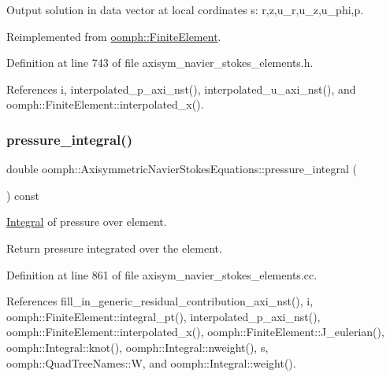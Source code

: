 Output solution in data vector at local cordinates s\+: r,z,u\+\_\+r,u\+\_\+z,u\+\_\+phi,p. 



Reimplemented from \hyperlink{classoomph_1_1FiniteElement_a8bf3f75b55d4e67b644df3e22c192596}{oomph\+::\+Finite\+Element}.



Definition at line 743 of file axisym\+\_\+navier\+\_\+stokes\+\_\+elements.\+h.



References i, interpolated\+\_\+p\+\_\+axi\+\_\+nst(), interpolated\+\_\+u\+\_\+axi\+\_\+nst(), and oomph\+::\+Finite\+Element\+::interpolated\+\_\+x().

\mbox{\label{classoomph_1_1AxisymmetricNavierStokesEquations_a056e6c406e93a62763a0ac8912ce9e1b}} 
\subsubsection{\texorpdfstring{pressure\+\_\+integral()}{pressure\_integral()}}
{\footnotesize\ttfamily double oomph\+::\+Axisymmetric\+Navier\+Stokes\+Equations\+::pressure\+\_\+integral (\begin{DoxyParamCaption}{ }\end{DoxyParamCaption}) const}



\hyperlink{classoomph_1_1Integral}{Integral} of pressure over element. 

Return pressure integrated over the element. 

Definition at line 861 of file axisym\+\_\+navier\+\_\+stokes\+\_\+elements.\+cc.



References fill\+\_\+in\+\_\+generic\+\_\+residual\+\_\+contribution\+\_\+axi\+\_\+nst(), i, oomph\+::\+Finite\+Element\+::integral\+\_\+pt(), interpolated\+\_\+p\+\_\+axi\+\_\+nst(), oomph\+::\+Finite\+Element\+::interpolated\+\_\+x(), oomph\+::\+Finite\+Element\+::\+J\+\_\+eulerian(), oomph\+::\+Integral\+::knot(), oomph\+::\+Integral\+::nweight(), s, oomph\+::\+Quad\+Tree\+Names\+::W, and oomph\+::\+Integral\+::weight().



